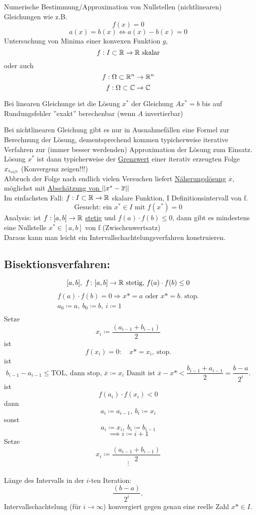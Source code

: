 \documentclass[../Skript.tex]{subfiles}
\begin{document}
    Numerische Bestimmung/Approximation von Nullstellen (nichtlinearen) Gleichungen wie z.B.
    $$f(x) = 0$$ \[
        a(x) = b(x) \iff a(x) - b(x) = 0\]
    Untersuchung von Minima einer konvexen Funktion $g$, $$f:I\subset \mathbb{R} \to \mathbb{R}\text{ skalar}$$ oder auch
    \[
        f:\Omega \subset \mathbb{R}^n \to \mathbb{R}^n\]\[f:\Omega\subset \mathbb{C} \to \mathbb{C}\]
    \begin{reminder}
        Bei linearen Gleichunge ist die Lösung $x^*$ der Gleichung  $ Ax^* = b$
        bis auf Rundungsfehler ''exakt'' berechenbar (wenn $A$ invertierbar)
    \end{reminder}
    Bei nichtlinearen Gleichung gibt es nur in Ausnahmefällen eine Formel zur Berechnung
    der Lösung, dementsprechend kommen typicherweise iterative Verfahren zur 
    (immer besser werdenden) Approximation der Lösung zum Einsatz.
    Lösung $x^*$ ist dann typicherweise der \underline{Grenzwert} einer iterativ
    erzeugten Folge \(x_{i_{i\in \mathbb{N}}}\) (Konvergenz zeigen{\huge !!!})\\
    Abbruch der Folge nach endlich vielen Versuchen liefert 
    \underline{Näherungslösung} \(\overline{x}\), möglichst mit
    \underline{Abschätzung von \(\left\vert\left\vert x^*-\overline{x}\right\vert\right\vert\)}\\

    Im einfachsten Fall: \(f:I\subset \mathbb{R}\to\mathbb{R}\) skalare Funktion, I 
    Definitionsintervall von f.
    \[\text{Gesucht: ein }x^*\in I\text{ mit }f(x^*)=0\]
    Analysis: ist \(f:[a,b]\to \mathbb{R}\) \underline{stetig} und \(f(a)\cdot f(b)\leq 0\),
    dann gibt es mindestens eine Nullstelle \(x^*\in [a,b]\) von f (Zwischenwertsatz)
    \\
    Daraus kann man leicht ein Intervallschachtelungsverfahren konstruieren.


\subsection*{Bisektionsverfahren:}
\[[a,b],\ f\colon [a,b]\to \mathbb{R} \text{ stetig, } f(a)\cdot f(b)\leq 0\]
\begin{align*}
    f(a)\cdot f(b)=0 \Rightarrow x*=a \text{ oder } x*=b.   \text{ stop.}\\
    a_0\coloneqq a,\ b_0\coloneqq b, \ i\coloneqq 1\\
\end{align*}
Setze \[x_i\coloneqq\frac{(a_{i-1}+b_{i-1})}{2}\] 
ist \[f(x_i)=0\colon \quad x*=x_i,\ \text{stop.}\]
ist \[b_{i-1}-a_{i-1}\leq \text{TOL, dann stop, } \overline{x}\coloneqq x_i\text{   Damit ist } \overline{x}- x*<\frac{b_{i-1}+a_{i-1}}{2}=\frac{b-a}{2^i}.\]
ist \[f(a_i)\cdot f(x_i)<0 \]
dann\[a_i\coloneqq a_{i-1},\ b_i\coloneqq x_{i}\]
sonst \[a_i\coloneqq x_i,\ b_i\coloneqq b_{i-1}\]
\[\implies i\coloneqq i+1\] 
Setze \[x_i\coloneqq\frac{(a_{i-1}+b_{i-1})}{2}\]
\[\vdots\]
\\
Länge des Intervalls in der \(i\)-ten Iteration:\\
\[\frac{(b-a)}{2^i},\]
Intervallschachtelung (für \(i\to \infty\)) konvergiert gegen genau eine reelle Zahl \(x*\in I\).\\
\end{document}
